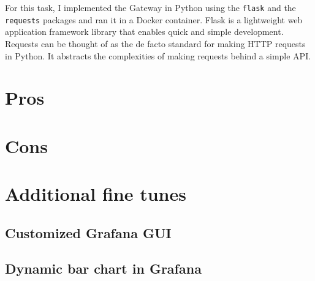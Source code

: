 For this task, I implemented the Gateway in Python using the \texttt{flask} and the \texttt{requests} packages and ran it in a Docker container. Flask is a lightweight web application framework library that enables quick and simple development. Requests can be thought of as the de facto standard for making HTTP requests in Python. It abstracts the complexities of making requests behind a simple API.



\section{Pros}

\section{Cons}

\section{Additional fine tunes}

\subsection{Customized Grafana GUI}

\subsection{Dynamic bar chart in Grafana}